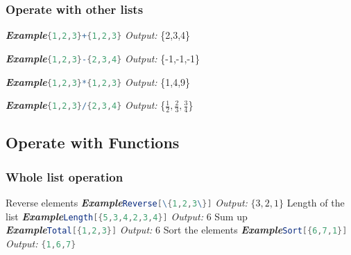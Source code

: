 \documentclass[10pt]{book}
\begin{document}
\subsubsection{Operate with other lists}
\noindent\emph{\textbf{Example}}\quad \lstinline[language=Mathematica]|{1,2,3}+{1,2,3}| \hspace{\fill}\emph{Output:} \{2,3,4\}

\noindent\emph{\textbf{Example}}\quad \lstinline[language=Mathematica]|{1,2,3}-{2,3,4}| \hspace{\fill}\emph{Output:} \{-1,-1,-1\}

\noindent\emph{\textbf{Example}}\quad \lstinline[language=Mathematica]|{1,2,3}*{1,2,3}| \hspace{\fill}\emph{Output:} \{1,4,9\}

\noindent\emph{\textbf{Example}}\quad \lstinline[language=Mathematica]|{1,2,3}/{2,3,4}| \hspace{\fill}\emph{Output:} \{$\frac{1}{2},\frac{2}{3},\frac{3}{4}$\}

\subsection{Operate with Functions}

\subsubsection{Whole list operation}
\noindent Reverse elements
\newline
\noindent\emph{\textbf{Example}}\quad \lstinline[language=Mathematica]|Reverse[\{1,2,3\}]| \hspace{\fill}\emph{Output:} $\{3,2,1\}$
\newline
\newline
\noindent Length of the list
\newline
\noindent\emph{\textbf{Example}}\quad \lstinline[language=Mathematica]|Length[{5,3,4,2,3,4}]| \hspace{\fill}\emph{Output:} $6$
\newline
\newline
\noindent Sum up
\newline
\noindent\emph{\textbf{Example}}\quad \lstinline[language=Mathematica]|Total[{1,2,3}]| \hspace{\fill}\emph{Output:} $6$
\newline
\newline
\noindent Sort the elements
\newline
\noindent\emph{\textbf{Example}}\quad \lstinline[language=Mathematica]|Sort[{6,7,1}]| \hspace{\fill}\emph{Output:} \lstinline[language=Mathematica]|{1,6,7}| 
\end{document}
